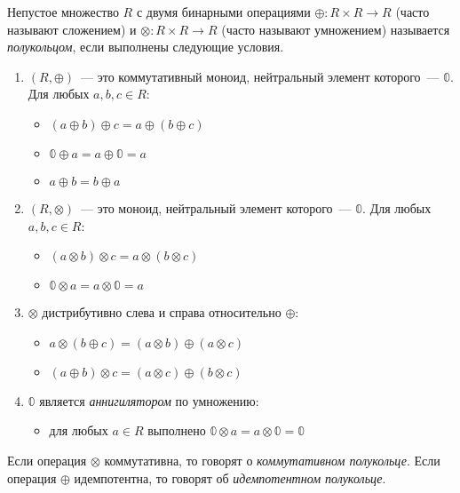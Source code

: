 \begin{definition}[Полукольцо]
    Непустое множество $R$ с двумя бинарными операциями $\oplus: R \times R \to R$ (часто называют сложением) и $\otimes: R \times R \to R$ (часто называют умножением) называется \emph{полукольцом}, если выполнены следующие условия.
    \begin{enumerate}
        \item $(R, \oplus)$~--- это коммутативный моноид, нейтральный элемент которого~--- $\Bbbzero$. Для любых $a, b, c \in R$:
              \begin{itemize}
                  \item $(a \oplus b) \oplus c = a \oplus (b \oplus c)$
                  \item $\Bbbzero \oplus a = a \oplus \Bbbzero = a$
                  \item $a \oplus b = b \oplus a$
              \end{itemize}
        \item $(R, \otimes)$~--- это моноид, нейтральный элемент которого~--- $\Bbbzero$. Для любых $a, b, c \in R$:
              \begin{itemize}
                  \item $(a \otimes b) \otimes c = a \otimes (b \otimes c)$
                  \item $\Bbbzero \otimes a = a \otimes \Bbbzero = a$
              \end{itemize}
        \item $\otimes$ дистрибутивно слева и справа относительно $\oplus$:
              \begin{itemize}
                  \item $a \otimes (b \oplus c) = (a \otimes b) \oplus (a \otimes c)$
                  \item $(a \oplus b) \otimes c = (a \otimes c) \oplus (b \otimes c)$
              \end{itemize}
        \item $\Bbbzero$ является \emph{аннигилятором} по умножению:
              \begin{itemize}
                  \item для любых $a \in R$ выполнено $\Bbbzero \otimes a = a \otimes \Bbbzero = \Bbbzero$
              \end{itemize}
    \end{enumerate}
    Если операция $\otimes$ коммутативна, то говорят о \emph{коммутативном полукольце}.
    Если операция $\oplus$ идемпотентна, то говорят об \emph{идемпотентном полукольце}.
\end{definition}

